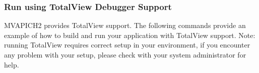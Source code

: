 \subsubsection{Run using TotalView Debugger Support}
\label{subsec:mpi-tv}

MVAPICH2 provides TotalView support. The following commands provide an example
of how to build and run your application with TotalView support. Note: running
TotalView requires correct setup in your environment, if you encounter any
problem with your setup, please check with your system administrator for help.

